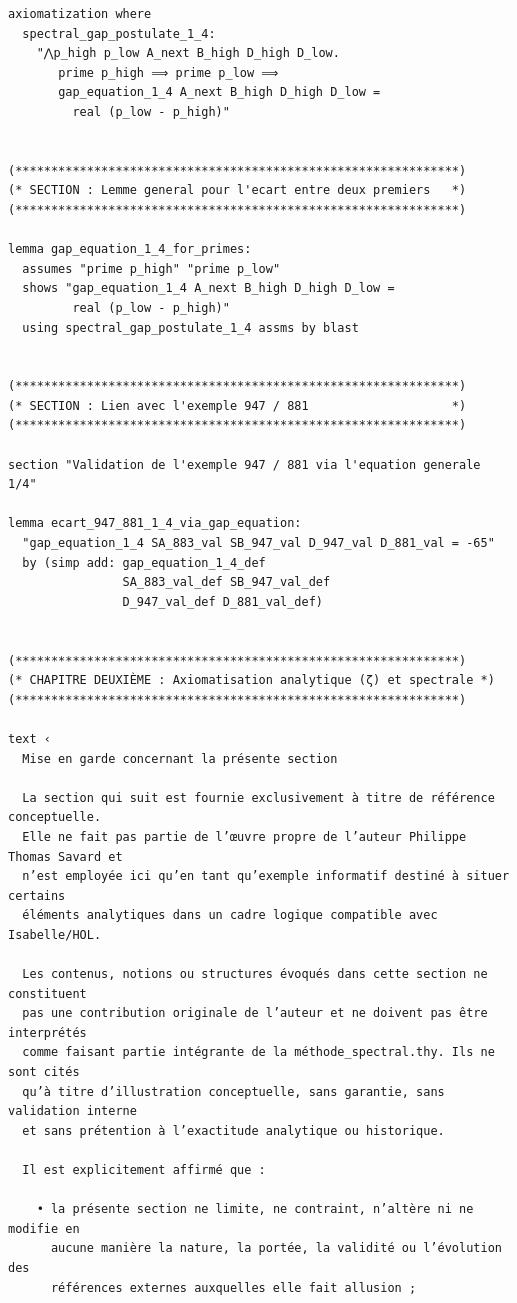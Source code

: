 \documentclass[a4paper,11pt]{article}
\begin{document}
\begin{holcode}[title={\textcolor{white}{File: methode\_spectral.thy -- Part 1/4}}]
\begin{lstlisting}
axiomatization where
  spectral_gap_postulate_1_4:
    "⋀p_high p_low A_next B_high D_high D_low.
       prime p_high ⟹ prime p_low ⟹
       gap_equation_1_4 A_next B_high D_high D_low =
         real (p_low - p_high)"


(**************************************************************)
(* SECTION : Lemme general pour l'ecart entre deux premiers   *)
(**************************************************************)

lemma gap_equation_1_4_for_primes:
  assumes "prime p_high" "prime p_low"
  shows "gap_equation_1_4 A_next B_high D_high D_low =
         real (p_low - p_high)"
  using spectral_gap_postulate_1_4 assms by blast


(**************************************************************)
(* SECTION : Lien avec l'exemple 947 / 881                    *)
(**************************************************************)

section "Validation de l'exemple 947 / 881 via l'equation generale 1/4"

lemma ecart_947_881_1_4_via_gap_equation:
  "gap_equation_1_4 SA_883_val SB_947_val D_947_val D_881_val = -65"
  by (simp add: gap_equation_1_4_def
                SA_883_val_def SB_947_val_def
                D_947_val_def D_881_val_def)


(**************************************************************)
(* CHAPITRE DEUXIÈME : Axiomatisation analytique (ζ) et spectrale *)
(**************************************************************)

text ‹
  Mise en garde concernant la présente section

  La section qui suit est fournie exclusivement à titre de référence conceptuelle.
  Elle ne fait pas partie de l’œuvre propre de l’auteur Philippe Thomas Savard et
  n’est employée ici qu’en tant qu’exemple informatif destiné à situer certains
  éléments analytiques dans un cadre logique compatible avec Isabelle/HOL.

  Les contenus, notions ou structures évoqués dans cette section ne constituent
  pas une contribution originale de l’auteur et ne doivent pas être interprétés
  comme faisant partie intégrante de la méthode_spectral.thy. Ils ne sont cités
  qu’à titre d’illustration conceptuelle, sans garantie, sans validation interne
  et sans prétention à l’exactitude analytique ou historique.

  Il est explicitement affirmé que :

    • la présente section ne limite, ne contraint, n’altère ni ne modifie en
      aucune manière la nature, la portée, la validité ou l’évolution des
      références externes auxquelles elle fait allusion ;


\end{lstlisting}
\end{holcode}
\end{document}
